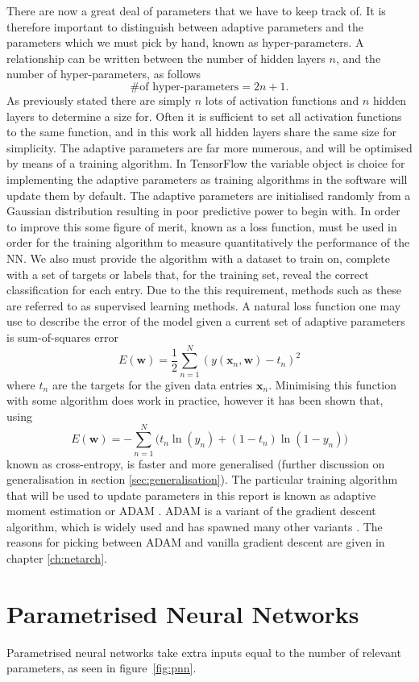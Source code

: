 
\par There are now a great deal of parameters that we have to keep track of. It
is therefore important to distinguish between adaptive parameters and the
parameters which we must pick by hand, known as hyper-parameters. A relationship
can be written between the number of hidden layers $n$, and the number of
hyper-parameters, as follows
\begin{equation}
\text{\# of hyper-parameters} = 2n + 1.
\label{eq:hyper}
\end{equation}
As previously stated there are simply $n$ lots of activation functions and $n$
hidden layers to determine a size for. Often it is sufficient to set all
activation functions to the same function, and in this work all hidden layers
share the same size for simplicity. The adaptive parameters are far more
numerous, and will be optimised by means of a training algorithm. In TensorFlow
the variable object is choice for implementing the adaptive parameters as
training algorithms in the software will update them by default. The adaptive
parameters are initialised randomly from a Gaussian distribution resulting in
poor predictive power to begin with. In order to improve this some figure of
merit, known as a loss function, must be used in order for the training
algorithm to measure quantitatively the performance of the NN. We also must
provide the algorithm with a dataset to train on, complete with a set of targets
or labels that, for the training set, reveal the correct classification for each
entry. Due to the this requirement, methods such as these are referred to as
supervised learning methods. A natural loss function one may use to describe the
error of the model given a current set of adaptive parameters is sum-of-squares
error
\begin{equation}
E(\boldsymbol{w}) = \frac{1}{2}\sum_{n=1}^{N}(y(\boldsymbol{x}_n, \boldsymbol{w}) - t_n)^2
\label{eq:sumofsquares}
\end{equation}
where $t_n$ are the targets for the given data entries $\boldsymbol{x}_n$.
Minimising this function with some algorithm does work in practice, however it
has been shown that, using
\begin{equation}
E(\boldsymbol{w}) = - \sum_{n=1}^{N} \Bigg (t_n \ln (y_n) + (1-t_n) \ln (1-y_n) \Bigg)
\label{eq:xentropy}
\end{equation}
known as cross-entropy, is faster and more generalised \cite{XEntropySimard}
(further discussion on generalisation in section \ref{sec:generalisation}). The
particular training algorithm that will be used to update parameters in this
report is known as adaptive moment estimation or ADAM \cite{ADAMOpt}. ADAM is a
variant of the gradient descent algorithm, which is widely used and has spawned
many other variants \cite{GDOverview}. The reasons for picking between ADAM and
vanilla gradient descent are given in chapter \ref{ch:netarch}.


\section{Parametrised Neural Networks}%
\label{sec:param-neural-nets}
Parametrised neural networks take extra inputs equal to the number of relevant
parameters, as seen in figure~\ref{fig:pnn}.



